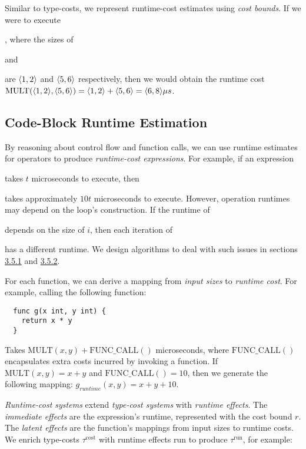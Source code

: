 Similar to type-costs, we represent runtime-cost estimates using \textit{cost bounds}. If we were to execute , where the sizes of  and  are \( \langle{1, 2}\rangle \) and \( \langle{5, 6}\rangle \) respectively, then we would obtain the runtime cost \( { \text{MULT}(\langle{1, 2}\rangle, \langle{5, 6}\rangle) = \langle{1, 2}\rangle + \langle{5, 6}\rangle = \langle{6, 8}\rangle \mu s  } \).

\subsection{Code-Block Runtime Estimation}

\label{sec:2.6.2}

By reasoning about control flow and function calls, we can use runtime estimates for operators to produce \textit{runtime-cost expressions}. For example, if an expression  takes \( t \) microseconds to execute, then  takes approximately \( 10t \) microseconds to execute. However, operation runtimes may depend on the loop's construction. If the runtime of  depends on the size of \( i \), then each iteration of  has a different runtime. We design algorithms to deal with such issues in sections \hyperref[sec:3.5.1]{3.5.1} and \hyperref[sec:3.5.2]{3.5.2}.

For each function, we can derive a mapping from \textit{input sizes} to \textit{runtime cost}. For example, calling the following function:

\begin{verbatim}
  func g(x int, y int) { 
    return x * y 
  }
\end{verbatim}

\newpage

Takes \( \text{MULT}(x, y) + \text{FUNC\_CALL}() \) microseconds, where \( \text{FUNC\_CALL}() \) encapsulates extra costs incurred by invoking a function. If \( \text{MULT}(x, y) = x + y \) and \( \text{FUNC\_CALL}() = 10 \), then we generate the following mapping: \( g_{\textit{runtime}}(x, y) = x + y + 10 \).

\textit{Runtime-cost systems} extend \textit{type-cost systems} with \textit{runtime effects}. The \textit{immediate effects} are the expression's runtime, represented with the cost bound \( r \). The \textit{latent effects} are the function's mappings from input sizes to runtime costs. We enrich type-costs \( \tau^\textrm{cost} \) with runtime effects \( \textrm{run} \) to produce \( \tau^\textrm{run} \), for example:

